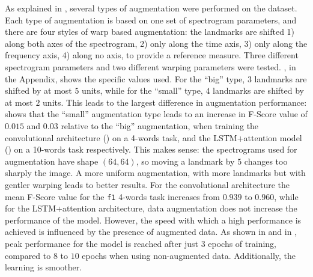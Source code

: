As explained in , several types of augmentation
were performed on the dataset.
%
%
Each type of augmentation is based on one set of spectrogram parameters, and
there are four styles of warp based augmentation: the landmarks are shifted 1)
along both axes of the spectrogram, 2) only along the time axis, 3) only along
the frequency axis, 4) along no axis, to provide a reference measure. Three
different spectrogram parameters and two different warping parameters were
tested. , in the Appendix, shows the specific values used.
For the ``big'' type, $3$ landmarks are shifted by at most $5$ units, while for
the ``small'' type, $4$ landmarks are shifted by at most $2$ units.
This leads to the largest difference in augmentation performance:
 shows that the ``small''
augmentation type leads to an increase in F-Score value of $0.015$ and $0.03$
relative to the ``big'' augmentation, when training the convolutional
architecture () on a 4-words task, and the
LSTM+attention model () on a 10-words task
respectively.
%
This makes sense: the spectrograms used for augmentation have shape $(64, 64)$,
so moving a landmark by $5$ changes too sharply the image. A more uniform
augmentation, with more landmarks but with gentler warping leads to better
results.
%
For the convolutional architecture the mean F-Score value for the \texttt{f1}
4-words task increases from $0.939$ to $0.960$, while for the LSTM+attention
architecture, data augmentation does not increase the performance of the model.
However, the speed with which a high performance is achieved is influenced by
the presence of augmented data. As shown in
 and in
, peak performance for the model is
reached after
just $3$ epochs of training, compared to $8$ to $10$ epochs when
using non-augmented data.
%
Additionally, the learning is smoother.

